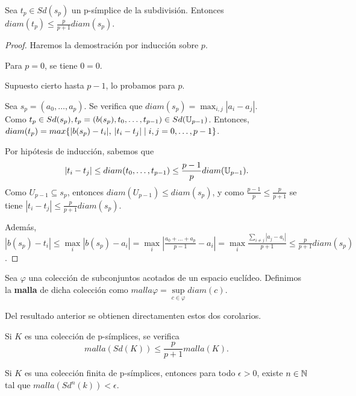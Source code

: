 \begin{proposition}
  Sea $t_p \in Sd(s_p)$ un p-símplice de la subdivisión. Entonces $diam(t_p) \leq \frac{p}{p+1} diam(s_p)$.
\end{proposition}

\begin{proof}
  Haremos la demostración por inducción sobre $p$.

  Para $p = 0$, se tiene $0 = 0$.

  Supuesto cierto hasta $p-1$, lo probamos para $p$.

  Sea $s_p = (a_0, \dots, a_p)$. Se verifica que $diam(s_p) = \max_{i,j} |a_i - a_j|$. \\
  Como $t_p \in Sd(s_p), t_p = (b(s_p), t_0, \dots, t_{p-1}) \in Sd({\mathbb U}_{p-1})$.
  Entonces, $diam(t_p) = max\{|b(s_p) - t_i|,\hspace{0.2em} |t_i - t_j| \mid i,j = 0, \dots, p-1\}$.

  Por hipótesis de inducción, sabemos que
  \[|t_i - t_j| \leq diam(t_0, \dots, t_{p-1}) \leq \frac{p-1}{p} diam({\mathbb U}_{p-1}).\]
  Como $U_{p-1} \subseteq s_p$, entonces $diam(U_{p-1}) \leq diam(s_p)$, y como $\frac{p-1}{p} \leq \frac{p}{p+1}$
  se tiene $|t_i - t_j| \leq \frac{p}{p+1} diam(s_p)$.

  Además, $|b(s_p) - t_i| \leq \max\limits_i |b(s_p) - a_i| = \max\limits_i |\frac{a_0 + \dots + a_p}{p-1} - a_i| =
  \max\limits_i \frac{\sum\limits_{i \neq j} |a_j - a_i|}{p+1} \leq \frac{p}{p+1} diam(s_p)$.
\end{proof}

\begin{definition}
  Sea $\varphi$ una colección de subconjuntos acotados de un espacio euclídeo. Definimos la \textbf{malla} de
  dicha colección como $malla \varphi = \sup\limits_{c \in \varphi} diam(c)$.
\end{definition}

Del resultado anterior se obtienen directamenten estos dos corolarios.

\begin{corollary}
  Si $K$ es una colección de p-símplices, se verifica \[malla(Sd(K)) \leq \frac{p}{p+1} malla(K). \]
\end{corollary}

\begin{corollary}
  Si $K$ es una colección finita de p-símplices, entonces para todo $\epsilon > 0$, existe $n \in {\mathbb N}$ tal que $malla(Sd^n(k)) < \epsilon$.
\end{corollary}

